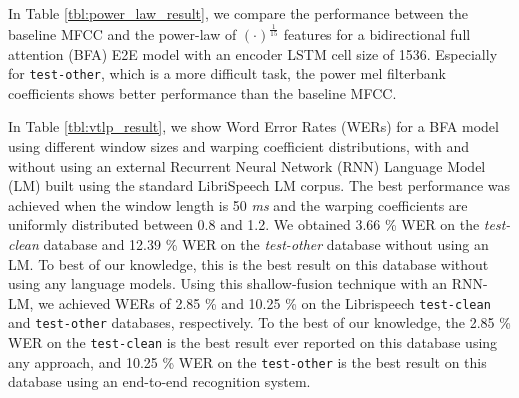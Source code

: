 \documentclass[a4paper]{article}
\begin{document}
In Table \ref{tbl:power_law_result}, we compare the performance between
the baseline MFCC and the power-law of $(\cdot)^{\frac{1}{15}}$ features 
for a bidirectional full attention (BFA) E2E model with an encoder LSTM 
cell size of 1536. Especially for {\tt test-other}, which
is a more difficult task, the power mel filterbank coefficients 
shows better performance than the baseline MFCC.

In Table \ref{tbl:vtlp_result}, we show Word Error Rates (WERs) for a BFA model using 
different window sizes and warping coefficient distributions, with and without
using an external Recurrent Neural Network (RNN) Language Model (LM) 
\cite{a_zeyer_interspeech_2018_00} built using the standard LibriSpeech LM corpus.
The best performance was achieved when the window length is 50 {\it ms} and 
the warping coefficients are uniformly distributed between 0.8 and 1.2.
We obtained 3.66 \% WER on the {\it test-clean} database and 12.39 \%
WER on the {\it test-other} database without using an LM. 
To best of our knowledge, this is the
best result on this database without using any language models.
Using this shallow-fusion technique 
  with an RNN-LM, we achieved WERs of 2.85 \% and 10.25 \% 
  on the Librispeech {\tt test-clean} and {\tt test-other} databases, respectively.
To the best of our knowledge, the 2.85 \% WER on the {\tt test-clean} 
is the best result ever reported on this database using any approach, 
and 10.25 \% WER on the {\tt test-other} is the best result on this database using 
  an end-to-end recognition system.
\end{document}
